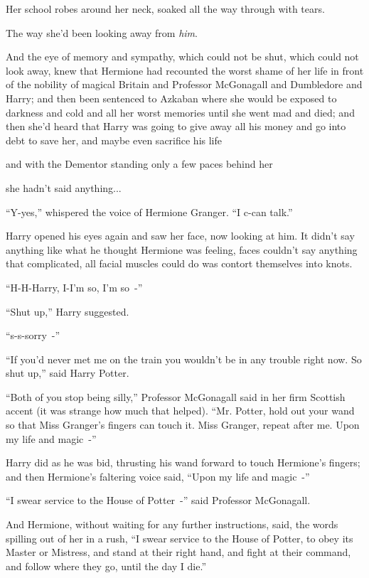 Her school robes around her neck, soaked all the way through with tears.

The way she'd been looking away from \emph{him}.

And the eye of memory and sympathy, which could not be shut, which could not look away, knew that Hermione had recounted the worst shame of her life in front of the nobility of magical Britain and Professor McGonagall and Dumbledore and Harry; and then been sentenced to Azkaban where she would be exposed to darkness and cold and all her worst memories until she went mad and died; and then she'd heard that Harry was going to give away all his money and go into debt to save her, and maybe even sacrifice his life

and with the Dementor standing only a few paces behind her

she hadn't said anything...

``Y-yes,'' whispered the voice of Hermione Granger. ``I c-can talk.''

Harry opened his eyes again and saw her face, now looking at him. It didn't say anything like what he thought Hermione was feeling, faces couldn't say anything that complicated, all facial muscles could do was contort themselves into knots.

``H-H-Harry, I-I'm so, I'm so~-''

``Shut up,'' Harry suggested.

``s-s-sorry~-''

``If you'd never met me on the train you wouldn't be in any trouble right now. So shut up,'' said Harry Potter.

``Both of you stop being silly,'' Professor McGonagall said in her firm Scottish accent (it was strange how much that helped). ``Mr. Potter, hold out your wand so that Miss Granger's fingers can touch it. Miss Granger, repeat after me. Upon my life and magic~-''

Harry did as he was bid, thrusting his wand forward to touch Hermione's fingers; and then Hermione's faltering voice said, ``Upon my life and magic~-''

``I swear service to the House of Potter~-'' said Professor McGonagall.

And Hermione, without waiting for any further instructions, said, the words spilling out of her in a rush, ``I swear service to the House of Potter, to obey its Master or Mistress, and stand at their right hand, and fight at their command, and follow where they go, until the day I die.''

